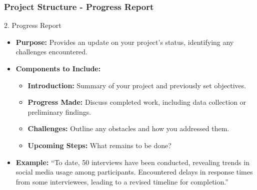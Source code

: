 \documentclass[aspectratio=169]{beamer}
\begin{document}
\begin{frame}[fragile]
    \frametitle{Project Structure - Progress Report}
    \begin{block}{2. Progress Report}
        \begin{itemize}
            \item \textbf{Purpose:} Provides an update on your project's status, identifying any challenges encountered.
            \item \textbf{Components to Include:}
                \begin{itemize}
                    \item \textbf{Introduction:} Summary of your project and previously set objectives.
                    \item \textbf{Progress Made:} Discuss completed work, including data collection or preliminary findings.
                    \item \textbf{Challenges:} Outline any obstacles and how you addressed them.
                    \item \textbf{Upcoming Steps:} What remains to be done?
                \end{itemize}
            \item \textbf{Example:} “To date, 50 interviews have been conducted, revealing trends in social media usage among participants. Encountered delays in response times from some interviewees, leading to a revised timeline for completion.”
        \end{itemize}
    \end{block}
\end{frame}
\end{document}
